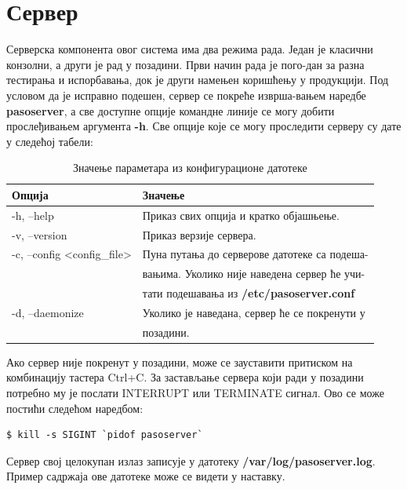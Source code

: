 \documentclass[a4paper, 12pt, diplomski]{etfcyr}
\begin{document}
		\section{Сервер}
			\begin{justify}
				Серверска компонента овог система има два режима рада. Један је класични конзолни, а други је рад у позадини. Први начин рада је пого-дан за разна тестирања и испорбавања, док је други намењен коришћењу у продукцији. Под условом да је исправно подешен, сервер се покреће изврша-вањем наредбе \textbf{pasoserver}, а све доступне опције командне линије се могу добити прослеђивањем аргумента \textbf{-h}. Све опције које се могу проследити серверу су дате у следећој табели:
				\begin{table}[H]
					\begin{tabular}{l l}
						Опција & Значење \\
						\hline
						-h, --help & Приказ свих опција и кратко објашњење. \\
						-v, --version & Приказ верзије сервера. \\
						-c, --config <config\_file> & Пуна путања до серверове датотеке са подеша- \\
						&вањима. Уколико није наведена сервер ће учи- \\
						&тати подешавања из \textbf{/etc/pasoserver.conf} \\
						-d, --daemonize & Уколико је наведана, сервер ће се покренути у \\
						&позадини. \\
						\hline
					\end{tabular}
					\caption{Значење параметара из конфигурационе датотеке}
					\label{table:server_cmd_line_args}
				\end{table}
				Ако сервер није покренут у позадини, може се зауставити притиском на комбинацију тастера Ctrl+C. За застављање сервера који ради у позадини потребно му је послати INTERRUPT или TERMINATE сигнал. Ово се може постићи следећом наредбом:
				\begin{footnotesize}
					\begin{verbatim}
$ kill -s SIGINT `pidof pasoserver`
					\end{verbatim}
				\end{footnotesize}
				\noindent
				Сервер свој целокупан излаз записује у датотеку \textbf{/var/log/pasoserver.log}. Пример садржаја ове датотеке може се видети у наставку.
				\begin{tiny}
					\begin{verbatim}

\end{verbatim}
\end{tiny}
\end{justify}
\end{document}

